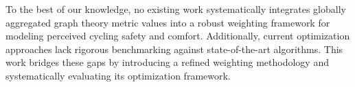 \documentclass[lettersize,journal]{IEEEtran}
\begin{document}

To the best of our knowledge, no existing work systematically integrates globally aggregated graph theory metric values into a robust weighting framework for modeling perceived cycling safety and comfort.
Additionally, current optimization approaches lack rigorous benchmarking against state-of-the-art algorithms. This work bridges these gaps by introducing a refined weighting methodology and systematically evaluating its optimization framework.



\end{document}
